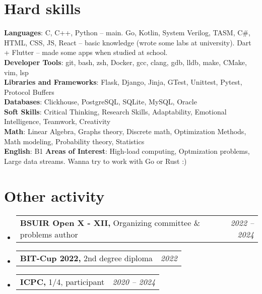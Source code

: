 \documentclass[a4paper,11pt]{article}
\makeatletter
\newcommand{\resumePOR}[3]{
\vspace{0.5mm}\item
    \begin{tabular*}{0.97\textwidth}[t]{l@{\extracolsep{\fill}}r}
        \textbf{#1}\hspace{0.3mm}#2 & \textit{\small{#3}} 
    \end{tabular*}
    \vspace{-2mm}
}
\newcommand{\resumeSubHeadingListStart}{\begin{itemize}[leftmargin=*,labelsep=0mm]}
\newcommand{\resumeSubHeadingListEnd}{\end{itemize}\vspace{2mm}}
\makeatother
\begin{document}
\section{\textbf{Hard skills}}
 \begin{itemize}[leftmargin=0.1in, label={}]
    \small{\item{
     \textbf{Languages}{: C, C++, Python -- main. Go, Kotlin, System Verilog, TASM, C\#, HTML, CSS, JS, React -- basic knowledge (wrote some labs at university). Dart + Flutter -- made some apps when studied at school.} \\
     \textbf{Developer Tools}{: git, bash, zsh, Docker, gcc, clang, gdb, lldb, make, CMake, vim, lsp} \\
     \textbf{Libraries and Frameworks}{: Flask, Django, Jinja, GTest, Unittest, Pytest, Protocol Buffers} \\
     \textbf{Databases}{: Clickhouse, PostgreSQL, SQLite, MySQL, Oracle} \\
     \textbf{Soft Skills}{: Critical Thinking, Research Skills, Adaptability, Emotional Intelligence, Teamwork, Creativity} \\
     \textbf{Math}{: Linear Algebra, Graphs theory, Discrete math, Optimization Methods, Math modeling, Probability theory, Statistics} \\
     \textbf{English}{: B1}
     \textbf{Areas of Interest}{: High-load computing, Optmization problems, Large data streams. Wanna try to work with Go or Rust :)} \\
    }}
 \end{itemize}
 \vspace{-16pt}



\section{\textbf{Other activity}}
\vspace{-0.4mm}
\resumeSubHeadingListStart
\resumePOR{BSUIR Open X - XII, }
    {Organizing committee \& problems author}
    {2022 -- 2024}
\resumePOR{BIT-Cup 2022, }
    {2nd degree diploma}
    {2022}
\resumePOR{ICPC, }
    {1/4, participant}
    {2020 -- 2024}
\resumeSubHeadingListEnd
\vspace{-5mm}

\end{document}
